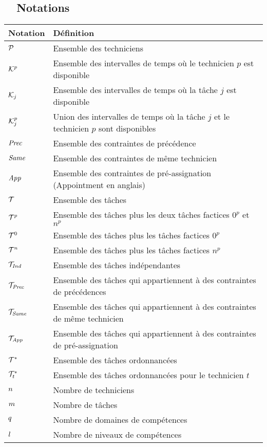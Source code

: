 
\begin{appendix}
    \chapter{~~Notations}
    \label{annexe:notation}
\begin{table}[H]
\begin{tabular}{ll}
\hline
Notation & Définition\\ 
\hline
$\mathcal{P}$ & Ensemble des techniciens \\
$\mathcal{K}^{p}$ & Ensemble des intervalles de temps où le technicien $p$ est disponible \\
$\mathcal{K}_{j}$ & Ensemble des intervalles de temps où la tâche $j$ est disponible \\
$\mathcal{K}_{j}^{p}$ & Union des intervalles de temps où la tâche $j$ et le technicien $p$ sont disponibles\\
$\textit{Prec}$ & Ensemble des contraintes de précédence\\
$\textit{Same}$ & Ensemble des contraintes de même technicien \\
$\textit{App}$ & Ensemble des contraintes de pré-assignation (Appointment en anglais)\\
$\mathcal{T}$ & Ensemble des tâches \\
$\mathcal{T}^p$ & Ensemble des tâches plus les deux tâches factices $0^p$ et $n^p$ \\
$\mathcal{T}^0$ & Ensemble des tâches plus les tâches factices $0^p$\\
$\mathcal{T}^n$ & Ensemble des tâches plus les tâches factices $n^p$ \\
$\mathcal{T}_{\textit{Ind}}$ & Ensemble des tâches indépendantes\\
$\mathcal{T}_{\textit{Prec}}$ & Ensemble des tâches qui appartiennent à des contraintes de précédences\\
$\mathcal{T}_{\textit{Same}}$ & Ensemble des tâches qui appartiennent à des contraintes de même technicien \\
$\mathcal{T}_{\textit{App}}$ & Ensemble des tâches qui appartiennent à des contraintes de pré-assignation \\
$\mathcal{T}^*$ & Ensemble des tâches ordonnancées \\
$\mathcal{T}^*_t$ & Ensemble des tâches ordonnancées pour le technicien $t$\\
$n$ & Nombre de techniciens \\
$m$ & Nombre de tâches\\
$q$ & Nombre de domaines de compétences \\
$l$ & Nombre de niveaux de compétences \\

\end{tabular}
\end{table}
\end{appendix}
